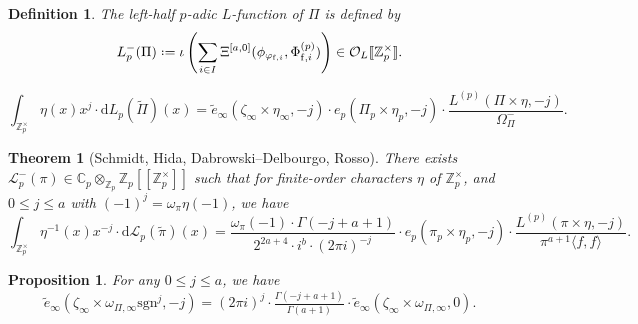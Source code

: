 \documentclass[10pt,a4paper]{amsart}
\newtheorem{definition}{Definition}
\newtheorem{theorem}{Theorem}
\newtheorem{proposition}{Proposition}
\newcommand{\Cp}{\mathbb{C}_p}
\newcommand{\Poref}{\tilde\Pi}
\newcommand{\Zp}{\mathbb{Z}_p}
\newcommand{\cL}{\mathcal{L}}
\newcommand{\cO}{\mathcal{O}}
\newcommand*{\defeq}{\mathrel{\vcenter{\baselineskip0.5ex \lineskiplimit0pt
                     \hbox{\scriptsize.}\hbox{\scriptsize.}}}%
                     =}
\begin{document}
\begin{definition}\label{def:p-adic L-function}
The \emph{left-half $p$-adic $L$-function} of $\Pi$ is defined by
\[ L_p^-(\Pi) \defeq \iota\left( \sum_{i \in I} \Xi^{[a,0]}(\phi_{\varphi_{\mathrm{f}, i}},\Phi^{(p)}_{\mathrm{f}, i})\right) \in \cO_L[\![\Zp^\times]\!].\]
\end{definition}

\begin{equation} \label{eq:interpolation intermediate 2}
\int_{\Zp^\times} \eta(x)x^{j} \cdot \mathrm{d}L_p(\Poref)(x)  =
\widetilde{e}_\infty(\zeta_\infty \times \eta_\infty,-j) \cdot e_p(\Pi_p \times \eta_{p}, -j)\cdot \frac{L^{(p)}(\Pi \times \eta, -j)}{\Omega_\Pi^-}.
\end{equation}

\begin{theorem}[Schmidt, Hida, Dabrowski--Delbourgo, Rosso] \label{thm:sym square}
There exists $\cL_p^-(\pi) \in \Cp\otimes_{\Zp}\Zp[\![\Zp^\times]\!]$ such that for finite-order characters $\eta$ of $\Zp^\times$, and $0 \leq j \leq a$ with $(-1)^j = \omega_\pi\eta(-1)$, we have
\begin{equation}\label{eq:sym square}
	\int_{\Zp^\times} \eta^{-1}(x)x^{-j}\cdot \mathrm{d}\cL_p(\tilde\pi)(x) = \frac{\omega_\pi(-1)\cdot \Gamma(-j+a+1)}{2^{2a+4}\cdot i^b \cdot (2\pi i)^{-j}} \cdot e_p(\pi_p \times \eta_p,-j)\cdot \frac{L^{(p)}(\pi\times\eta,-j)}{\pi^{a+1}\langle f,f\rangle}.
\end{equation}
\end{theorem}

\begin{proposition}\label{prop:ratio}
	For any $0 \leq j \leq a$, we have
	\[
		\widetilde{e}_\infty(\zeta_\infty \times \omega_{\Pi,\infty}\mathrm{sgn}^j,-j) = (2\pi i)^{j} \cdot \tfrac{\Gamma(-j+a+1)}{\Gamma(a+1)} \cdot \widetilde{e}_\infty(\zeta_\infty\times \omega_{\Pi,\infty},0).
	\]
\end{proposition}
\end{document}
